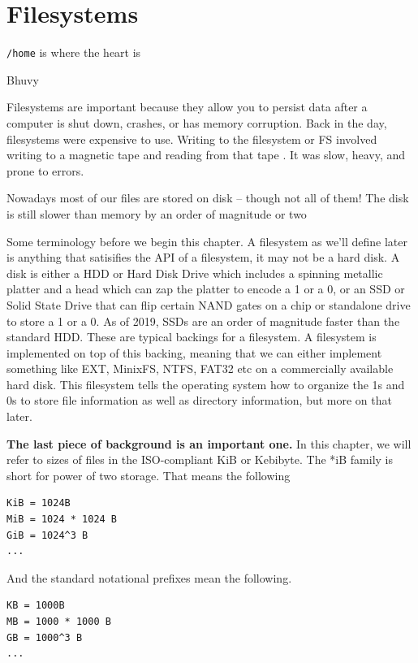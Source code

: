 \chapter{Filesystems}

\epigraph{\texttt{/home} is where the heart is}{Bhuvy}

Filesystems are important because they allow you to persist data after a computer is shut down, crashes, or has memory corruption.
Back in the day, filesystems were expensive to use.
Writing to the filesystem or FS involved writing to a magnetic tape and reading from that tape .
It was slow, heavy, and prone to errors.

Nowadays most of our files are stored on disk -- though not all of them!
The disk is still slower than memory by an order of magnitude or two 


Some terminology before we begin this chapter.
A filesystem as we'll define later is anything that satisifies the API of a filesystem, it may not be a hard disk.
A disk is either a HDD or Hard Disk Drive which includes a spinning metallic platter and a head which can zap the platter to encode a 1 or a 0, or an SSD or Solid State Drive that can flip certain NAND gates on a chip or standalone drive to store a 1 or a 0.
As of 2019, SSDs are an order of magnitude faster than the standard HDD.
These are typical backings for a filesystem.
A filesystem is implemented on top of this backing, meaning that we can either implement something like EXT, MinixFS, NTFS, FAT32 etc on a commercially available hard disk.
This filesystem tells the operating system how to organize the 1s and 0s to store file information as well as directory information, but more on that later.

\textbf{The last piece of background is an important one.} In this chapter, we will refer to sizes of files in the ISO-compliant KiB or Kebibyte. The *iB family is short for power of two storage.
That means the following

\begin{verbatim}
KiB = 1024B
MiB = 1024 * 1024 B
GiB = 1024^3 B
...
\end{verbatim}

And the standard notational prefixes mean the following.

\begin{verbatim}
KB = 1000B
MB = 1000 * 1000 B
GB = 1000^3 B
...
\end{verbatim}

